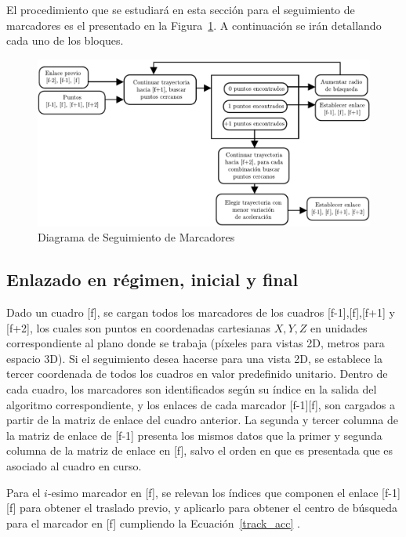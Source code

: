 El procedimiento que se estudiará en esta sección para el seguimiento de marcadores es el presentado en la Figura~\ref{diagrama_seguimiento}. A continuación se irán detallando cada uno de los bloques. 
\begin{figure}[H]
\hspace{-1cm}
\includegraphics[scale=0.71]{img/Tracking/diagrama_seguimiento}
\caption{Diagrama de Seguimiento de Marcadores}
\label{diagrama_seguimiento}
\end{figure}


\subsection{Enlazado en régimen, inicial y final}

Dado un cuadro [f], se cargan todos los marcadores de los cuadros [f-1],[f],[f+1] y [f+2], los cuales son puntos en coordenadas cartesianas $X,Y,Z$ en unidades correspondiente al plano donde se trabaja (píxeles para vistas 2D, metros para espacio 3D). Si el seguimiento desea hacerse para una vista 2D, se establece la tercer coordenada de todos los cuadros en valor predefinido unitario. Dentro de cada cuadro, los marcadores son identificados según su índice en la salida del algoritmo correspondiente, y los enlaces de cada marcador [f-1][f], son cargados a partir de la matriz de enlace del cuadro anterior. La segunda y tercer columna de la matriz de enlace de [f-1] presenta los mismos datos que la primer y segunda columna de la matriz de enlace en [f], salvo el orden en que es presentada que es asociado al cuadro en curso.

Para el $i$-esimo marcador en [f], se relevan los índices que componen el enlace [f-1][f] para obtener el traslado previo, y aplicarlo para obtener el centro de búsqueda para el marcador en [f] cumpliendo la Ecuación~\ref{track_acc} .

